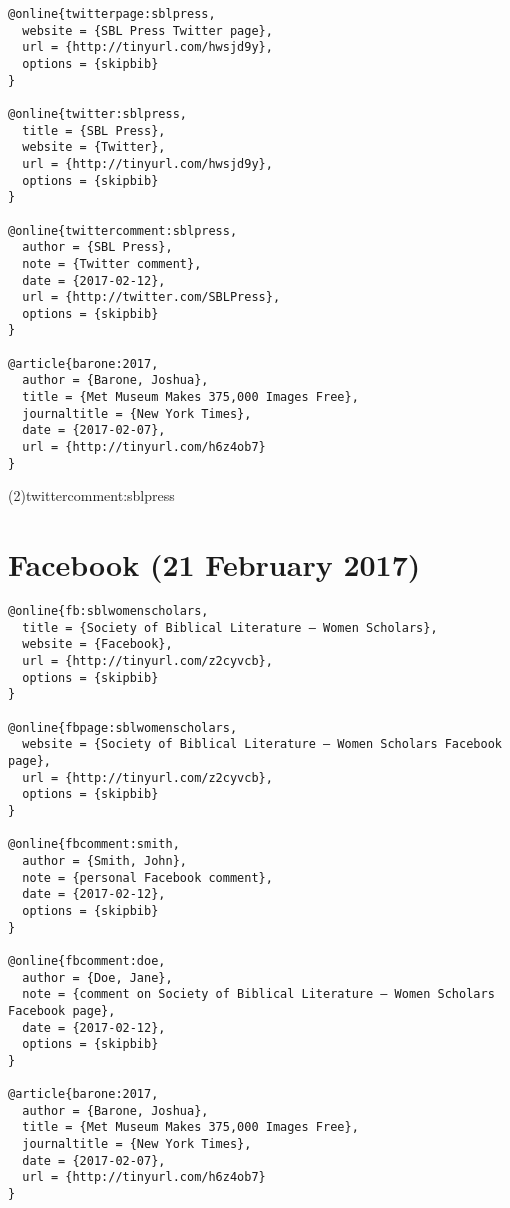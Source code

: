 \documentclass[a4paper]{article}
\renewcommand\footnote[1]{##1}%
\begin{document}
\begin{verbatim}
@online{twitterpage:sblpress,
  website = {SBL Press Twitter page},
  url = {http://tinyurl.com/hwsjd9y},
  options = {skipbib}
}

@online{twitter:sblpress,
  title = {SBL Press},
  website = {Twitter},
  url = {http://tinyurl.com/hwsjd9y},
  options = {skipbib}
}

@online{twittercomment:sblpress,
  author = {SBL Press},
  note = {Twitter comment},
  date = {2017-02-12},
  url = {http://twitter.com/SBLPress},
  options = {skipbib}
}

@article{barone:2017,
  author = {Barone, Joshua},
  title = {Met Museum Makes 375,000 Images Free},
  journaltitle = {New York Times},
  date = {2017-02-07},
  url = {http://tinyurl.com/h6z4ob7}
}
\end{verbatim}

\examplecite(2){twittercomment:sblpress}
\examplebibliography
{}

\section{Facebook (21 February 2017)}

\begin{verbatim}
@online{fb:sblwomenscholars,
  title = {Society of Biblical Literature – Women Scholars},
  website = {Facebook},
  url = {http://tinyurl.com/z2cyvcb},
  options = {skipbib}
}

@online{fbpage:sblwomenscholars,
  website = {Society of Biblical Literature – Women Scholars Facebook page},
  url = {http://tinyurl.com/z2cyvcb},
  options = {skipbib}
}

@online{fbcomment:smith,
  author = {Smith, John},
  note = {personal Facebook comment},
  date = {2017-02-12},
  options = {skipbib}
}

@online{fbcomment:doe,
  author = {Doe, Jane},
  note = {comment on Society of Biblical Literature – Women Scholars Facebook page},
  date = {2017-02-12},
  options = {skipbib}
}

@article{barone:2017,
  author = {Barone, Joshua},
  title = {Met Museum Makes 375,000 Images Free},
  journaltitle = {New York Times},
  date = {2017-02-07},
  url = {http://tinyurl.com/h6z4ob7}
}
\end{verbatim}
\end{document}
